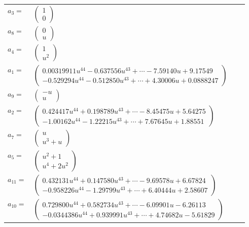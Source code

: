 \documentclass[1p]{elsarticle_modified}
\theoremstyle{definition}
\begin{document}
\begin{tabular}{m{7pt} m{180pt} m{7pt} m{180pt} }
\flushright $a_{3}=$&$\begin{pmatrix}1\\0\end{pmatrix}$ \\
\flushright $a_{8}=$&$\begin{pmatrix}0\\u\end{pmatrix}$ \\
\flushright $a_{4}=$&$\begin{pmatrix}1\\u^2\end{pmatrix}$ \\
\flushright $a_{1}=$&$\begin{pmatrix}0.00319911 u^{44}-0.637556 u^{43}+\cdots-7.59140 u+9.17549\\-0.529294 u^{44}-0.512850 u^{43}+\cdots+4.30006 u+0.0888247\end{pmatrix}$ \\
\flushright $a_{9}=$&$\begin{pmatrix}- u\\u\end{pmatrix}$ \\
\flushright $a_{2}=$&$\begin{pmatrix}0.424417 u^{44}+0.198789 u^{43}+\cdots-8.45475 u+5.64275\\-1.00162 u^{44}-1.22215 u^{43}+\cdots+7.67645 u+1.88551\end{pmatrix}$ \\
\flushright $a_{7}=$&$\begin{pmatrix}u\\u^3+u\end{pmatrix}$ \\
\flushright $a_{5}=$&$\begin{pmatrix}u^2+1\\u^4+2 u^2\end{pmatrix}$ \\
\flushright $a_{11}=$&$\begin{pmatrix}0.432131 u^{44}+0.147580 u^{43}+\cdots-9.69578 u+6.67824\\-0.958226 u^{44}-1.29799 u^{43}+\cdots+6.40444 u+2.58607\end{pmatrix}$ \\
\flushright $a_{10}=$&$\begin{pmatrix}0.729800 u^{44}+0.582734 u^{43}+\cdots-6.09901 u-6.26113\\-0.0344386 u^{44}+0.939991 u^{43}+\cdots+4.74682 u-5.61829\end{pmatrix}$ \\

\end{tabular}
\end{document}
